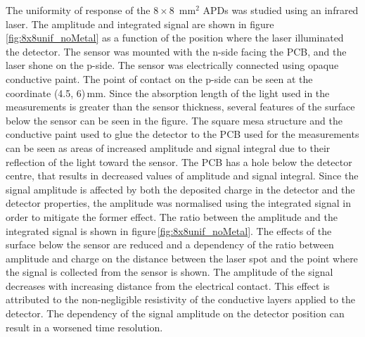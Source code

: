 \documentclass{article}
\begin{document}
The uniformity of response of the $8 \times 8$~mm$^2$ APDs was studied using an infrared laser.
The amplitude and integrated signal are shown in figure\,\ref{fig:8x8unif_noMetal} as a function of the position where the laser illuminated the detector.
The sensor was mounted with the n-side facing the PCB, and the laser shone on the p-side.
The sensor was electrically connected using opaque conductive paint.
The point of contact on the p-side can be seen at the coordinate (4.5, 6)\,mm.
Since the absorption length of the light used in the measurements is greater than the sensor thickness, several features of the surface below the sensor can be seen in the figure.
The square mesa structure and the conductive paint used to glue the detector to the PCB used for the measurements can be seen as areas of increased amplitude and signal integral due to their reflection of the light toward the sensor.
The PCB has a hole below the detector centre, that results in decreased values of amplitude and signal integral.
Since the signal amplitude is affected by both the deposited charge in the detector and the detector properties, the amplitude was normalised using the integrated signal in order to mitigate the former effect.
The ratio between the amplitude and the integrated signal is shown in figure\,\ref{fig:8x8unif_noMetal}.
The effects of the surface below the sensor are reduced and a dependency of the ratio between amplitude and charge on the distance between the laser spot and the point where the signal is collected from the sensor is shown.
The amplitude of the signal decreases with increasing distance from the electrical contact.
This effect is attributed to the non-negligible resistivity of the conductive layers applied to the detector.
The dependency of the signal amplitude on the detector position can result in a worsened time resolution.
\end{document}
